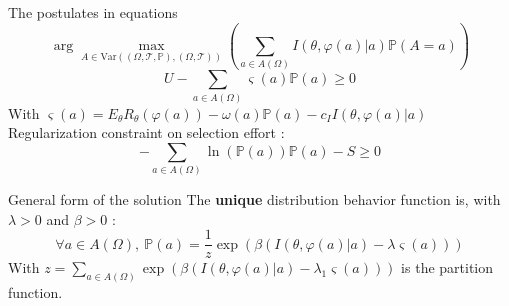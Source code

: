 \documentclass[final]{beamer}
\newcommand{\R}{\mathbb{R}}
\newcommand{\Proba}{\mathbb{P}}
\newlength{\colwidth}
\begin{document}
\begin{frame}[t]
\begin{columns}[t]
\begin{column}{\colwidth}
  \begin{block}{The postulates in equations}
$$\arg \max \limits_{A \in \text{Var} ((\Omega, \mathcal{T}, \Proba), (\Omega,  \mathcal{T}))} \left( \sum \limits_{a \in A(\Omega )}I \left( \theta , \varphi (a) | a \right) \Proba (A=a) \right)$$
\begin{equation}
\label{cont 1}
U - \sum \limits_{a \in A(\Omega )} \varsigma(a) \Proba (a) \geq 0
\end{equation}
With $\varsigma (a) = E_\theta R_\theta (\varphi (a)) - \omega (a) \Proba (a) - c_I  I \left( \theta , \varphi (a) | a \right)$
Regularization constraint on selection effort :
\begin{equation}
\label{cont 2}
- \sum \limits_{a \in A(\Omega )} \ln ( \Proba(a)) \Proba (a) - S \geq 0
\end{equation}
  \end{block}
 \begin{alertblock}{General form of the solution}
 The \textbf{unique} distribution behavior function is, with $\lambda > 0$ and $\beta > 0$ :
 $$\forall a \in A (\Omega) , \ \Proba (a) = \dfrac{1}{z} \exp  \left(  \beta \left(  I (\theta, \varphi (a) | a ) - \lambda \varsigma (a) \right) \right)$$
With $z = \sum \limits_{a \in A(\Omega)} \exp   \left( \beta \left(  I (\theta, \varphi (a) | a ) - \lambda_1 \varsigma (a) \right) \right) $ is the partition function.
 \end{alertblock}
 

\end{column}
\end{columns}
\end{frame}
\end{document}
